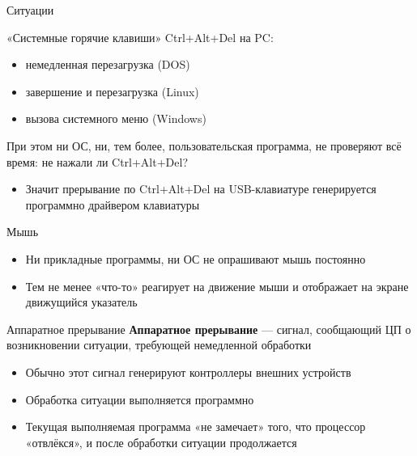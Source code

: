 \documentclass[xetex,aspectratio=43]{beamer}
\begin{document}
\begin{frame}{Ситуации}
	\begin{block}{«Системные горячие клавиши»}
		Ctrl+Alt+Del на PC:

		\begin{itemize}
			\tightlist
			\item
			немедленная перезагрузка (DOS)
			\item
			завершение и перезагрузка (Linux)
			\item
			вызова системного меню (Windows)
		\end{itemize}

		При этом ни ОС, ни, тем более, пользовательская программа, не проверяют всё время: не нажали ли Ctrl+Alt+Del?

		\pause
		\begin{itemize}
			\item
			Значит прерывание по Ctrl+Alt+Del на USB-клавиатуре генерируется
			программно драйвером клавиатуры
		\end{itemize}

	\end{block}

	\pause

	\begin{block}{Мышь}
		\begin{itemize}
			\tightlist
			\item
			Ни прикладные программы, ни ОС не опрашивают мышь постоянно
			\item
			Тем не менее «что-то» реагирует на движение мыши и отображает на
			экране движущийся указатель
		\end{itemize}
	\end{block}
\end{frame}

\begin{frame}
	\begin{block}{Аппаратное прерывание}
		\textbf{Аппаратное прерывание} --- сигнал, сообщающий ЦП о возникновении
		ситуации, требующей немедленной обработки

		\begin{itemize}
			\tightlist
			\item
			Обычно этот сигнал генерируют контроллеры внешних устройств
			\item
			Обработка ситуации выполняется программно
			\item
			Текущая выполняемая программа «не замечает» того, что процессор
			«отвлёкся», и после обработки ситуации продолжается
		\end{itemize}
	\end{block}
\end{frame}
\end{document}
